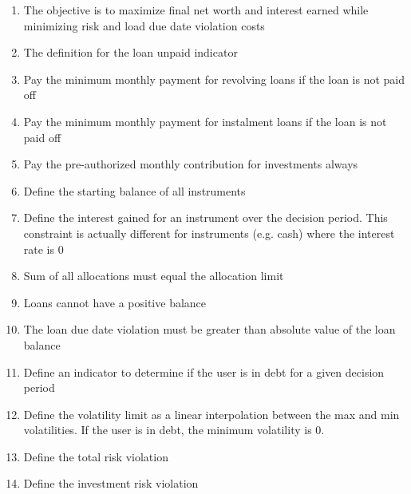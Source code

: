 \documentclass[11pt]{article}
\begin{document}
\begin{enumerate}
\setcounter{enumi}{0}
    \item The objective is to maximize final net worth and interest earned while minimizing risk and load due date violation costs
    \item The definition for the loan unpaid indicator
    \item Pay the minimum monthly payment for revolving loans if the loan is not paid off
    \item Pay the minimum monthly payment for instalment loans if the loan is not paid off
    \item Pay the pre-authorized monthly contribution for investments always
    \item Define the starting balance of all instruments
    \item Define the interest gained for an instrument over the decision period. This constraint is actually different for instruments (e.g. cash) where the interest rate is 0
    \item Sum of all allocations must equal the allocation limit
    \item Loans cannot have a positive balance
    \item The loan due date violation must be greater than absolute value of the loan balance
    \item Define an indicator to determine if the user is in debt for a given decision period
    \item Define the volatility limit as a linear interpolation between the max and min volatilities. If the user is in debt, the minimum volatility is 0.
    \item Define the total risk violation
    \item Define the investment risk violation
\end{enumerate}
\end{document}
